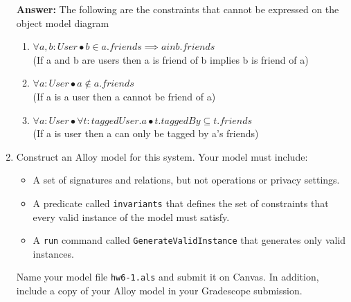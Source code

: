 \begin{enumerate}
        \textbf {Answer:} The following are the constraints that cannot be expressed on the object model diagram
            \begin {enumerate}
                \item $ \forall a, b: User \bullet b \in a.friends \implies a in b.friends $\\
(If a and b are users then a is friend of b implies b is friend of a)
                \item $ \forall a : User \bullet a \notin a.friends $\\
                    (If a is a user then a cannot be friend of a)
                \item $ \forall a : User \bullet \forall t : taggedUser.a \bullet t.taggedBy \subseteq t.friends $ \\
                    (If a is user then a can only be tagged by a’s friends)
            \end {enumerate}
	\item Construct an Alloy model for this system. Your model must
	      include:
	      \begin{itemize}
		      \item A set of signatures and relations, but not operations or
		            privacy settings.
		      \item A predicate called \texttt{invariants} that defines the
		            set of constraints that every valid instance of the model must satisfy.
		      \item A \texttt{run} command called \texttt{GenerateValidInstance} that generates only valid instances.
	      \end{itemize}
	      Name your model file \texttt{hw6-1.als}  and submit it on
	      Canvas. In addition, include a copy of your Alloy model in your
	      Gradescope submission. 
\end{enumerate}
